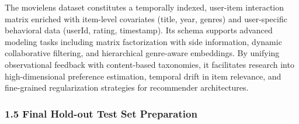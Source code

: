 \documentclass[
]{article}
\begin{document}
The movielens dataset constitutes a temporally indexed, user-item
interaction matrix enriched with item-level covariates (title, year,
genres) and user-specific behavioral data (userId, rating, timestamp).
Its schema supports advanced modeling tasks including matrix
factorization with side information, dynamic collaborative filtering,
and hierarchical genre-aware embeddings. By unifying observational
feedback with content-based taxonomies, it facilitates research into
high-dimensional preference estimation, temporal drift in item
relevance, and fine-grained regularization strategies for recommender
architectures.

\newpage

\subsubsection{1.5 Final Hold-out Test Set
Preparation}\label{final-hold-out-test-set-preparation}
\end{document}
